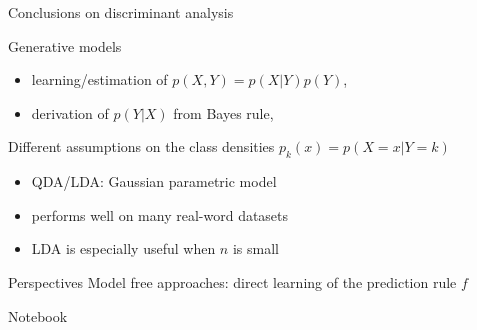 
\begin{frame}{Conclusions on discriminant analysis}
\begin{block}{Generative models}
   \begin{itemize}
      \item learning/estimation of $p(X,Y)= p(X | Y)p{(Y)}$,
      \item derivation of $p{(Y | X)}$ from Bayes rule,
   \end{itemize}
\end{block}
 \begin{block}{Different assumptions on the class densities $p_k(x)=p(X=x|Y=k)$}
      \begin{itemize}
      \item QDA/LDA: Gaussian parametric model
      \item[\doigt] performs well on many real-word datasets
      \item[\doigt] LDA is especially useful when $n$ is small
      \end{itemize}
\end{block}

\begin{block}{Perspectives}
   Model free approaches: direct learning of the prediction rule $f$
\end{block}

\alert{Notebook}

\end{frame}




